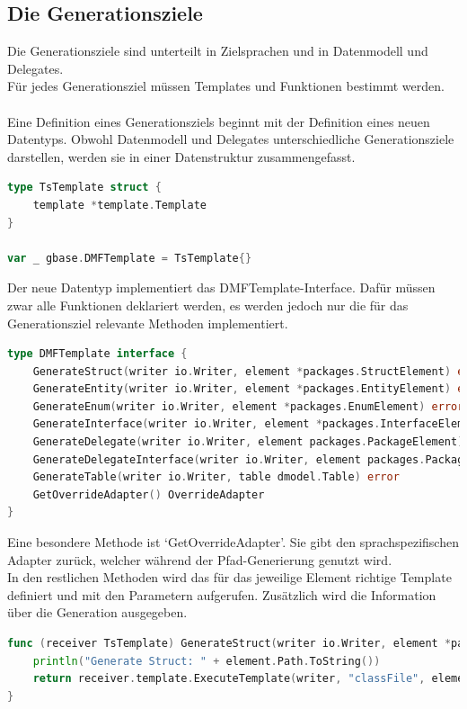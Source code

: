\documentclass[./einleitung.tex]{subfiles}
\begin{document}
    \subsection{Die Generationsziele}\label{subsec:die-generationsziele}
    Die Generationsziele sind unterteilt in Zielsprachen und in Datenmodell und Delegates.\\
    Für jedes Generationsziel müssen Templates und Funktionen bestimmt werden.
    \\\\
    Eine Definition eines Generationsziels beginnt mit der Definition eines neuen Datentyps.
    Obwohl Datenmodell und Delegates unterschiedliche Generationsziele darstellen, werden sie in einer Datenstruktur zusammengefasst.
    \begin{lstlisting}[language=Go, cation=Definition des TypeScript Generationsziel, label=lst:TsTemplate]
type TsTemplate struct {
	template *template.Template
}

var _ gbase.DMFTemplate = TsTemplate{}
    \end{lstlisting}
    Der neue Datentyp implementiert das DMFTemplate-Interface.
    Dafür müssen zwar alle Funktionen deklariert werden, es werden jedoch nur die für das Generationsziel relevante Methoden implementiert.
    \begin{lstlisting}[language=Go, caption=Definition des DMFTemplate-Interfaces, label=lst:DMFTemplate]
type DMFTemplate interface {
	GenerateStruct(writer io.Writer, element *packages.StructElement) error
	GenerateEntity(writer io.Writer, element *packages.EntityElement) error
	GenerateEnum(writer io.Writer, element *packages.EnumElement) error
	GenerateInterface(writer io.Writer, element *packages.InterfaceElement) error
	GenerateDelegate(writer io.Writer, element packages.PackageElement) error
	GenerateDelegateInterface(writer io.Writer, element packages.PackageElement) error
	GenerateTable(writer io.Writer, table dmodel.Table) error
    GetOverrideAdapter() OverrideAdapter
}
    \end{lstlisting}
    Eine besondere Methode ist `GetOverrideAdapter'.
    Sie gibt den sprachspezifischen Adapter zurück, welcher während der Pfad-Generierung genutzt wird.\\
    In den restlichen Methoden wird das für das jeweilige Element richtige Template definiert und mit den Parametern aufgerufen.
    Zusätzlich wird die Information über die Generation ausgegeben.
    \begin{lstlisting}[language=Go, caption=Aufruf der Generation einer TypeScript Klasse, label=lst:genTsClass]
func (receiver TsTemplate) GenerateStruct(writer io.Writer, element *packages.StructElement) error {
	println("Generate Struct: " + element.Path.ToString())
	return receiver.template.ExecuteTemplate(writer, "classFile", element)
}
    \end{lstlisting}
\end{document}
